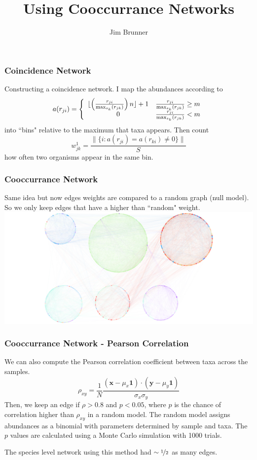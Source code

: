 \documentclass{beamer}
\author[Brunner]{Jim Brunner}
\institute[LANL]{Los Alamos National Laboratory}
\title{Using Cooccurrance Networks}
\date{}
\newcommand{\nhalf}{\nicefrac{1}{2}}
\renewcommand{\b}{\bm}
\begin{document}
\begin{frame}
\titlepage
\end{frame}
\begin{frame}
\frametitle{Coincidence Network}
Constructing a coincidence network.
I map the abundances according to
\[
a(r_{ji})  = \left\{
\begin{array}{c c}
\lfloor\left(\frac{r_{ji}}{\max_{s_k}(r_{jk})}\right) n \rfloor + 1 &  \frac{r_{ji}}{\max_{s_k}(r_{jk})} \geq m \\
0 & \frac{r_{ji}}{\max_{s_k}(r_{jk})} < m
\end{array}
\right.
\]
into ``bins" relative to the maximum that taxa appears. Then count 
\[
w^1_{jk} = \frac{\|\{i: a(r_{ji}) = a(r_{ki}) \neq 0\} \|}{S}
\]
how often two organisms appear in the same bin.
\end{frame}
\begin{frame}
\frametitle{Cooccurrance Network}
Same idea but now edges weights are compared to a random graph (null model). 
So we only keep edges that have a higher than ``random" weight.
\includegraphics[scale = 0.2]{june20/june20_species.png}
\end{frame}
\begin{frame}
\frametitle{Cooccurrance Network - Pearson Correlation}
We can also compute the Pearson correlation coefficient between taxa across the samples. 
\[
\rho_{xy} = \frac{1}{N}\frac{(\b{x}- \mu_x\b{1}) \cdot (\b{y} - \mu_y\b{1})}{\sigma_x \sigma_y}
\]
Then, we keep an edge if $\rho > 0.8$ and $p< 0.05$, where $p$ is the chance of correlation higher than $\rho_{xy}$ in a random model. The random model assigns abundances as a binomial with parameters determined by sample and taxa. The $p$ values are calculated using a Monte Carlo simulation with 1000 trials. 

The species level network using this method had $\sim \nhalf$ as many edges.
\end{frame}
\end{document}
